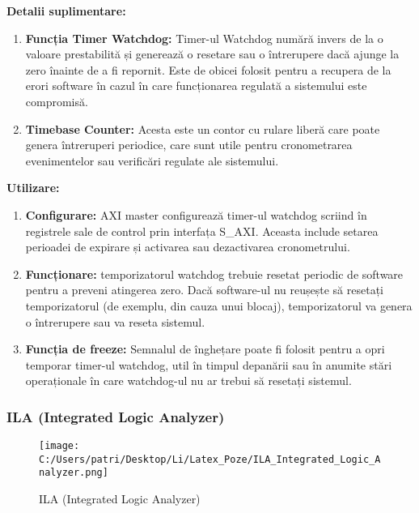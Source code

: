 \documentclass[12pt]{article}
\begin{document}
\hspace*{1cm}\textbf{Detalii suplimentare:}
\begin{enumerate}
    \item \textbf{Funcția Timer Watchdog:} Timer-ul Watchdog numără invers de la o valoare prestabilită și generează o resetare sau o întrerupere dacă ajunge la zero înainte de a fi repornit. Este de obicei folosit pentru a recupera de la erori software în cazul în care funcționarea regulată a sistemului este compromisă.
    \item \textbf{Timebase Counter:} Acesta este un contor cu rulare liberă care poate genera întreruperi periodice, care sunt utile pentru cronometrarea evenimentelor sau verificări regulate ale sistemului.\\
\end{enumerate}
\hspace*{1cm}\textbf{Utilizare:}
\begin{enumerate}
    \item \textbf{Configurare:} AXI master configurează timer-ul watchdog scriind în registrele sale de control prin interfața S\_AXI. Aceasta include setarea perioadei de expirare și activarea sau dezactivarea cronometrului.
    \item \textbf{Funcționare:} temporizatorul watchdog trebuie resetat periodic de software pentru a preveni atingerea zero. Dacă software-ul nu reușește să resetați temporizatorul (de exemplu, din cauza unui blocaj), temporizatorul va genera o întrerupere sau va reseta sistemul.
    \item \textbf{Funcția de freeze:} Semnalul de înghețare poate fi folosit pentru a opri temporar timer-ul watchdog, util în timpul depanării sau în anumite stări operaționale în care watchdog-ul nu ar trebui să resetați sistemul.
\end{enumerate}



\subsubsection{ILA (Integrated Logic Analyzer)}

\begin{figure}[H]
    \centering
    \texttt{[image: C:/Users/patri/Desktop/Li/Latex\_Poze/ILA\_Integrated\_Logic\_Analyzer.png]}
    \caption{ILA (Integrated Logic Analyzer)}
\end{figure}
\end{document}
